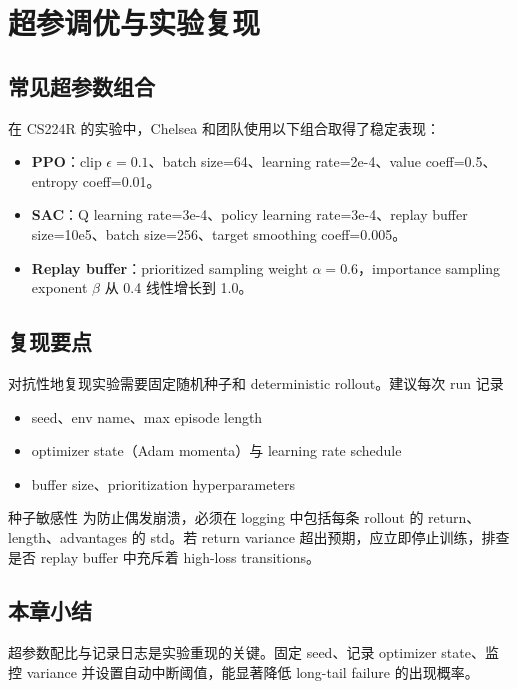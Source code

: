 \section{超参调优与实验复现}

\subsection{常见超参数组合}

在 CS224R 的实验中，Chelsea 和团队使用以下组合取得了稳定表现：

\begin{itemize}
    \item \textbf{PPO}：clip $\epsilon=0.1$、batch size=64、learning rate=2e-4、value coeff=0.5、entropy coeff=0.01。
    \item \textbf{SAC}：Q learning rate=3e-4、policy learning rate=3e-4、replay buffer size=10e5、batch size=256、target smoothing coeff=0.005。
    \item \textbf{Replay buffer}：prioritized sampling weight $\alpha=0.6$，importance sampling exponent $\beta$ 从 0.4 线性增长到 1.0。
\end{itemize}

\subsection{复现要点}

对抗性地复现实验需要固定随机种子和 deterministic rollout。建议每次 run 记录

\begin{itemize}
    \item seed、env name、max episode length
    \item optimizer state（Adam momenta）与 learning rate schedule
    \item buffer size、prioritization hyperparameters
\end{itemize}

\begin{warningbox}{种子敏感性}
为防止偶发崩溃，必须在 logging 中包括每条 rollout 的 return、length、advantages 的 std。若 return variance 超出预期，应立即停止训练，排查是否 replay buffer 中充斥着 high-loss transitions。
\end{warningbox}

\subsection{本章小结}

超参数配比与记录日志是实验重现的关键。固定 seed、记录 optimizer state、监控 variance 并设置自动中断阈值，能显著降低 long-tail failure 的出现概率。

